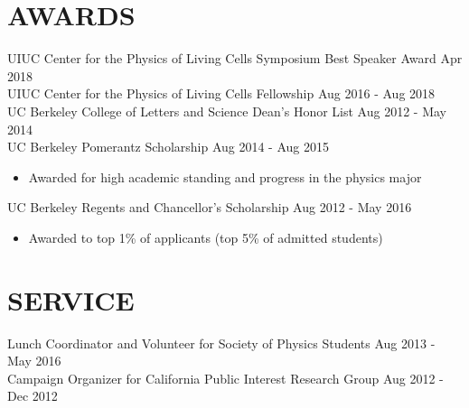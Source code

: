 \documentclass{res}
\newcommand{\rfill}{\hspace*{\fill}}
\begin{document}
\begin{resume}
\section{AWARDS}
   UIUC Center for the Physics of Living Cells Symposium Best Speaker Award \hfill Apr 2018\\
   UIUC Center for the Physics of Living Cells Fellowship \hfill Aug 2016 - Aug 2018\\
   UC Berkeley College of Letters and Science Dean's Honor List \hfill Aug 2012 - May 2014\\
   UC Berkeley Pomerantz Scholarship \hfill Aug 2014 - Aug 2015\\
   \begin{itemize}
   \item {\normalfont Awarded for high academic standing and progress in the physics major}
   \end{itemize}
   \vspace{-12pt}
   UC Berkeley Regents and Chancellor's Scholarship \hfill Aug 2012 - May 2016\\
   \begin{itemize}
   \item {\normalfont Awarded to top 1\% of applicants (top 5\% of admitted students)}
   \end{itemize}
\vspace{-10pt}
\section{SERVICE}
Lunch Coordinator and Volunteer for Society of Physics Students \rfill Aug 2013 - May 2016 \\
Campaign Organizer for California Public Interest Research Group \rfill Aug 2012 - Dec 2012 \\
\end{resume}
\end{document}
